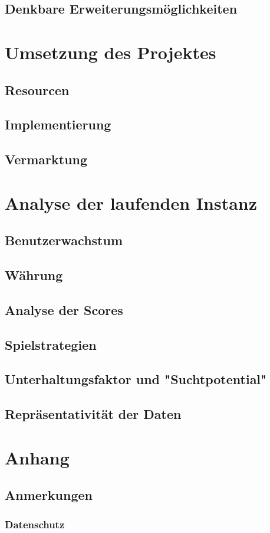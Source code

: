 \documentclass{scrreprt}
\begin{document}
\section{Denkbare Erweiterungsmöglichkeiten}

\chapter{Umsetzung des Projektes}
\section{Resourcen}
\section{Implementierung}
\section{Vermarktung}

\chapter{Analyse der laufenden Instanz}
\section{Benutzerwachstum}
\section{Währung}
\section{Analyse der Scores}
\section{Spielstrategien}
\section{Unterhaltungsfaktor und "Suchtpotential"}
\section{Repräsentativität der Daten}

\chapter{Anhang}
\section{Anmerkungen}
\subsection{Datenschutz}
\end{document}
